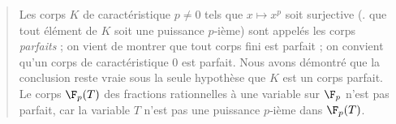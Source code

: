 \documentclass[11pt, useosf,
  title in boldface,
  theorem in new line,
  theorem numbering = section,
  number theorems separately,
]{simplivre}
\begin{document}
    \begin{quote}
        Les corps \( K \) de caractéristique \( p \neq 0 \) tels que \( x \mapsto x^p \) soit surjective (\ie. que tout élément de \( K \) soit une puissance \( p \)‑ième) sont appelés les corps \emph{parfaits} ; on vient de montrer que tout corps fini est parfait ; on convient qu'un corps de caractéristique \( 0 \) est parfait. Nous avons démontré que la conclusion  reste vraie sous la seule hypothèse que \( K \) est un corps parfait. Le corps \( \F_p(T) \) des fractions rationnelles à une variable sur \( \F_p \) n'est pas parfait, car la variable \( T \) n'est pas une puissance \( p \)‑ième dans \( \F_p(T) \).
    \end{quote}
\end{document}
